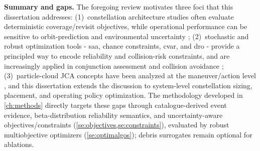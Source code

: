     \medskip
    \noindent\textbf{Summary and gaps.}
    The foregoing review motivates three foci that this dissertation addresses:
    (1)~constellation architecture studies often evaluate deterministic coverage/revisit objectives, while operational performance can be sensitive to orbit-prediction and environmental uncertainty \citep{ely1999GA,williams2001MOGA,ferringer2006jsr,GondelachLinares2019,EddyKochenderfer2019,NormanRivest2024};
    (2)~stochastic and robust optimization tools - \gls{saa}, chance constraints, \gls{cvar}, and \gls{dro} - provide a principled way to encode reliability and collision-risk constraints, and are increasingly applied in conjunction assessment and collision avoidance \citep{LaguelMalickVanAckooij2021,GonzaloColombo2020,RyuBouvierLalani2024};
    (3)~particle-cloud JCA concepts have been analyzed at the maneuver/action level \citep{JARRY2019185}, and this dissertation extends the discussion to system-level constellation sizing, placement, and operating policy optimization.
    The methodology developed in \cref{ch:methods} directly targets these gaps through catalogue-derived event evidence, beta-distribution reliability semantics, and uncertainty-aware objectives/constraints (\cref{se:objectives,se:constraints}), evaluated by robust multiobjective optimizers (\cref{se:optimalgos}); debris surrogates remain optional for ablations.

